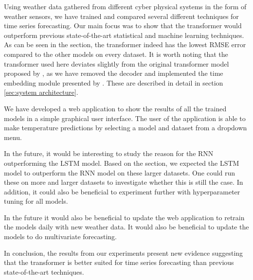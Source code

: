 Using weather data gathered from different cyber physical systems in the form of weather sensors, we have trained and compared several different techniques for time series forecasting.
Our main focus was to show that the transformer would outperform previous state-of-the-art statistical and machine learning techniques.
As can be seen in the  section, the transformer indeed has the lowest RMSE error compared to the other models on every dataset. 
It is worth noting that the transformer used here deviates slightly from the original transformer model proposed by \citet{AttentionIsAllYouNeed}, as we have removed the decoder and implemented the time embedding module presented by \citet{time2vec}.
These are described in detail in section \ref{sec:system architecture}.

We have developed a web application to show the results of all the trained models in a simple graphical user interface. 
The user of the application is able to make temperature predictions by selecting a model and dataset from a dropdown menu. 

In the future, it would be interesting to study the reason for the RNN outperforming the LSTM model.
Based on the  section, we expected the LSTM model to outperform the RNN model on these larger datasets.
One could run these on more and larger datasets to investigate whether this is still the case. 
In addition, it could also be beneficial to experiment further with hyperparameter tuning for all models.

In the future it would also be beneficial to update the web application to retrain the models daily with new weather data. It would also be beneficial to update the models to do multivariate forecasting.

In conclusion, the results from our experiments present new evidence suggesting that the transformer is better suited for time series forecasting than previous state-of-the-art techniques.